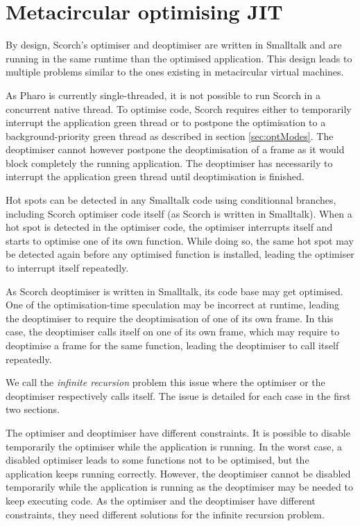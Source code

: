 \documentclass[a4paper,12pt,twoside]{../includes/ThesisStyle}
\begin{document}
\fi

\chapter{Metacircular optimising JIT}
\label{chap:metacircular}
\minitoc

By design, Scorch's optimiser and deoptimiser are written in Smalltalk and are running in the same runtime than the optimised application. This design leads to multiple problems similar to the ones existing in metacircular virtual machines. 

As Pharo is currently single-threaded, it is not possible to run Scorch in a concurrent native thread. To optimise code, Scorch requires either to temporarily interrupt the application green thread or to postpone the optimisation to a background-priority green thread as described in section \ref{sec:optModes}. The deoptimiser cannot however postpone the deoptimisation of a frame as it would block completely the running application. The deoptimiser has necessarily to interrupt the application green thread until deoptimisation is finished.

Hot spots can be detected in any Smalltalk code using conditionnal branches, including Scorch optimiser code itself (as Scorch is written in Smalltalk). When a hot spot is detected in the optimiser code, the optimiser interrupts itself and starts to optimise one of its own function. While doing so, the same hot spot may be detected again before any optimised function is installed, leading the optimiser to interrupt itself repeatedly. 

As Scorch deoptimiser is written in Smalltalk, its code base may get optimised. One of the optimisation-time speculation may be incorrect at runtime, leading the deoptimiser to require the deoptimisation of one of its own frame. In this case, the deoptimiser calls itself on one of its own frame, which may require to deoptimise a frame for the same function, leading the deoptimiser to call itself repeatedly. 

We call the \emph{infinite recursion} problem this issue where the optimiser or the deoptimiser respectively calls itself. The issue is detailed for each case in the first two sections.

The optimiser and deoptimiser have different constraints. It is possible to disable temporarily the optimiser while the application is running. In the worst case, a disabled optimiser leads to some functions not to be optimised, but the application keeps running correctly. However, the deoptimiser cannot be disabled temporarily while the application is running as the deoptimiser may be needed to keep executing code. As the optimiser and the deoptimiser have different constraints, they need different solutions for the infinite recursion problem.
\end{document}
